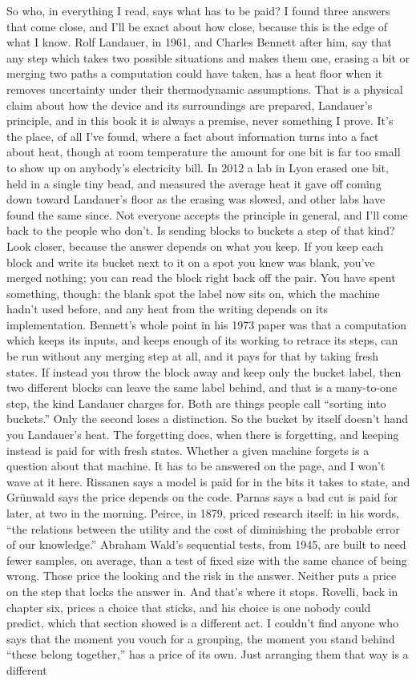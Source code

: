 \documentclass[11pt,twoside]{article}
\theoremstyle{thielethm}
\theoremstyle{thieledef}
\theoremstyle{thieledef}
\theoremstyle{thieledef}
\theoremstyle{thielethm}
\theoremstyle{thieleobs}
\theoremstyle{thielethm}
\begin{document}
So who, in everything I read, says what has to be paid? I found three answers that come close, and I'll be exact about how close, because this is the edge of what I know. Rolf Landauer, in 1961, and Charles Bennett after him, say that any step which takes two possible situations and makes them one, erasing a bit or merging two paths a computation could have taken, has a heat floor when it removes uncertainty under their thermodynamic assumptions. That is a physical claim about how the device and its surroundings are prepared, Landauer's principle, and in this book it is always a premise, never something I prove. It's the place, of all I've found, where a fact about information turns into a fact about heat, though at room temperature the amount for one bit is far too small to show up on anybody's electricity bill. In 2012 a lab in Lyon erased one bit, held in a single tiny bead, and measured the average heat it gave off coming down toward Landauer's floor as the erasing was slowed, and other labs have found the same since. Not everyone accepts the principle in general, and I'll come back to the people who don't. Is sending blocks to buckets a step of that kind? Look closer, because the answer depends on what you keep. If you keep each block and write its bucket next to it on a spot you knew was blank, you've merged nothing; you can read the block right back off the pair. You have spent something, though: the blank spot the label now sits on, which the machine hadn't used before, and any heat from the writing depends on its implementation. Bennett's whole point in his 1973 paper was that a computation which keeps its inputs, and keeps enough of its working to retrace its steps, can be run without any merging step at all, and it pays for that by taking fresh states. If instead you throw the block away and keep only the bucket label, then two different blocks can leave the same label behind, and that is a many-to-one step, the kind Landauer charges for. Both are things people call ``sorting into buckets.'' Only the second loses a distinction. So the bucket by itself doesn't hand you Landauer's heat. The forgetting does, when there is forgetting, and keeping instead is paid for with fresh states. Whether a given machine forgets is a question about that machine. It has to be answered on the page, and I won't wave at it here. Rissanen says a model is paid for in the bits it takes to state, and Grünwald says the price depends on the code. Parnas says a bad cut is paid for later, at two in the morning. Peirce, in 1879, priced research itself: in his words, ``the relations between the utility and the cost of diminishing the probable error of our knowledge.'' Abraham Wald's sequential tests, from 1945, are built to need fewer samples, on average, than a test of fixed size with the same chance of being wrong. Those price the looking and the risk in the answer. Neither puts a price on the step that locks the answer in. And that's where it stops. Rovelli, back in chapter six, prices a choice that sticks, and his choice is one nobody could predict, which that section showed is a different act. I couldn't find anyone who says that the moment you vouch for a grouping, the moment you stand behind ``these belong together,'' has a price of its own. Just arranging them that way is a different 
\end{document}
